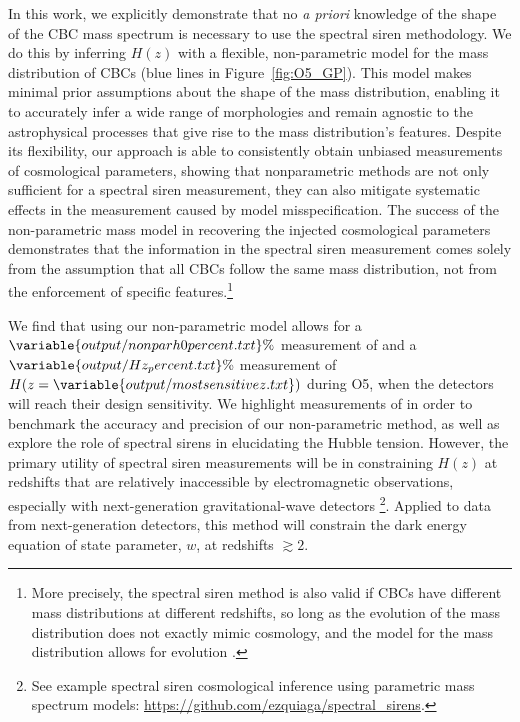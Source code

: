 \documentclass[preprint2,linenumbers]{aastex631}
\begin{document}
In this work, we explicitly demonstrate that no \emph{a priori}\/ knowledge of the shape of the \ac{CBC} mass spectrum is necessary to use the spectral siren methodology. 
We do this by inferring $H(z)$ with a flexible, non-parametric model for the mass distribution of \acp{CBC} (blue lines in Figure~\ref{fig:O5_GP}). 
This model makes minimal prior assumptions about the shape of the mass distribution, enabling it to accurately infer a wide range of morphologies and remain agnostic to the astrophysical processes that give rise to the mass distribution's features.
Despite its flexibility, our approach is able to consistently obtain unbiased measurements of cosmological parameters, showing that nonparametric methods are not only sufficient for a spectral siren measurement, they can also mitigate systematic effects in the measurement caused by model misspecification.
The success of the non-parametric mass model in recovering the injected cosmological parameters demonstrates that the information in the spectral siren measurement comes solely from the assumption that all \acp{CBC} follow the same mass distribution, not from the enforcement of specific features.\footnote{More precisely, the spectral siren method is also valid if \acp{CBC} have different mass distributions at different redshifts, so long as the evolution of the mass distribution does not exactly mimic cosmology, and the model for the mass distribution allows for evolution \citep{ezquiaga_spectral_2022}. }

We find that using our non-parametric model allows for a $\variable{output/nonparh0percent.txt}\%$ measurement of \Ho{} and a $\variable{output/Hz_percent.txt}\%$ measurement of $H(z=\variable{output/mostsensitivez.txt})$ during \ac{O5}, when the detectors will reach their design sensitivity. %
We highlight measurements of \Ho{} in order to benchmark the accuracy and precision of our non-parametric method, as well as explore the role of spectral sirens in elucidating the Hubble tension.
However, the primary utility of spectral siren measurements will be in constraining $H(z)$ at redshifts that are relatively inaccessible by electromagnetic observations, especially with next-generation gravitational-wave detectors \citep{ezquiaga_spectral_2022, Chen:2024gdn, You:2020wju}\footnote{See example spectral siren cosmological inference using parametric mass spectrum models: \href{https://github.com/ezquiaga/spectral_sirens}{https://github.com/ezquiaga/spectral\_sirens}.}.
Applied to data from next-generation detectors, this method will constrain the dark energy equation of state parameter, $w$, at redshifts $\gtrsim 2$.
\end{document}
